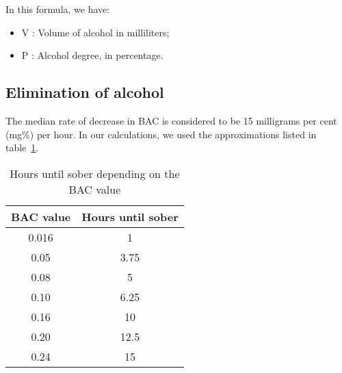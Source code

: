 In this formula, we have:

\begin{itemize}[noitemsep]
\item V : Volume of alcohol in milliliters;
\item P : Alcohol degree, in percentage.
\end{itemize}

\subsection{Elimination of alcohol}
\label{ssec:elim}

The median rate of decrease in BAC is considered to be 15 milligrams per cent (mg\%) per hour. In our calculations, we used the approximations listed in {\sc table}~\ref{tab:elim}.

\begin{table}[H]
\centering
\begin{tabular}{|c|c|}
  \hline
  \bf{BAC value} & \bf{Hours until sober}\\
  \hline
	0.016 & 1\\
	0.05 & 3.75\\
	0.08 & 5\\
	0.10 & 6.25\\
	0.16 & 10\\
	0.20 & 12.5\\
	0.24 & 15\\
  \hline
\end{tabular}
\caption{Hours until sober depending on the BAC value}
\label{tab:elim}
\end{table}